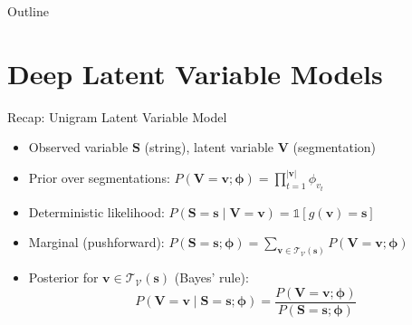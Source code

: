 \documentclass[11pt,compress,t,notes=noshow, xcolor=table]{beamer}
\newcommand{\vocab}{\mathcal{V}}
\newcommand{\probs}{\boldsymbol{\phi}}
\begin{document}
\begin{frame}{Outline}
\tableofcontents
\end{frame}

\section{Deep Latent Variable Models}

\begin{frame}{Recap: Unigram Latent Variable Model}


\vfill
 
\begin{itemize}
\item Observed variable $\mathbf{S}$ (string), latent variable $\mathbf{V}$ (segmentation)
\item Prior over segmentations: $P(\mathbf{V} = \mathbf{v}; \probs) = \prod_{t=1}^{|\mathbf{v}|} \phi_{v_t}$
\item Deterministic likelihood: $P(\mathbf{S} = \mathbf{s} \mid \mathbf{V} = \mathbf{v}) = \mathds{1}[g(\mathbf{v}) = \mathbf{s}]$
\item Marginal (pushforward): $P(\mathbf{S} = \mathbf{s}; \probs) = \sum_{\mathbf{v} \in \mathcal{T}_{\vocab}(\mathbf{s})} P(\mathbf{V} = \mathbf{v}; \probs)$
\item Posterior for $\mathbf{v} \in \mathcal{T}_{\vocab}(\mathbf{s})$ (Bayes' rule):
\begin{equation*}
P(\mathbf{V} = \mathbf{v} \mid \mathbf{S} = \mathbf{s}; \probs) = \frac{P(\mathbf{V} = \mathbf{v}; \probs)}{P(\mathbf{S} = \mathbf{s}; \probs)}
\end{equation*}
\end{itemize}
 
\vfill
 

\end{frame}
\end{document}

